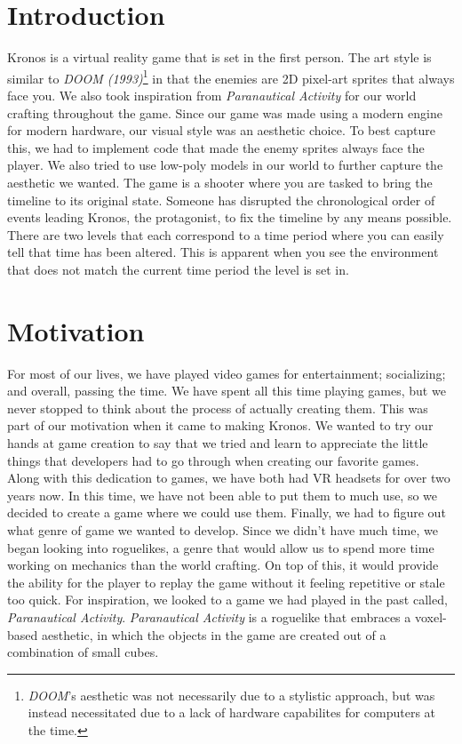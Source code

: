 \documentclass{sigchi}
\begin{document}
\section{Introduction}
Kronos is a virtual reality game that is set in the first person. The art style is similar to \textit{DOOM (1993)}\footnote[1]{\textit{DOOM}'s aesthetic was not necessarily due to a stylistic approach, but was instead necessitated due to a lack of hardware capabilites for computers at the time.} in that the enemies are 2D pixel-art sprites that always face you. We also took inspiration from \textit{Paranautical Activity} for our world crafting throughout the game. Since our game was made using a modern engine for modern hardware, our visual style was an aesthetic choice. To best capture this, we had to implement code that made the enemy sprites always face the player. We also tried to use low-poly models in our world to further capture the aesthetic we wanted. The game is a shooter where you are tasked to bring the timeline to its original state. Someone has disrupted the chronological order of events leading Kronos, the protagonist, to fix the timeline by any means possible. There are two levels that each correspond to a time period where you can easily tell that time has been altered. This is apparent when you see the environment that does not match the current time period the level is set in. 

\section{Motivation}
For most of our lives, we have played video games for entertainment; socializing; and overall, passing the time. We have spent all this time playing games, but we never stopped to think about the process of actually creating them. This was part of our motivation when it came to making Kronos. We wanted to try our hands at game creation to say that we tried and learn to appreciate the little things that developers had to go through when creating our favorite games. Along with this dedication to games, we have both had VR headsets for over two years now. In this time, we have not been able to put them to much use, so we decided to create a game where we could use them. Finally, we had to figure out what genre of game we wanted to develop. Since we didn’t have much time, we began looking into roguelikes, a genre that would allow us to spend more time working on mechanics than the world crafting. On top of this, it would provide the ability for the player to replay the game without it feeling repetitive or stale too quick. For inspiration, we looked to a game we had played in the past called, \textit{Paranautical Activity}. \textit{Paranautical Activity} is a roguelike that embraces a voxel-based aesthetic, in which the objects in the game are created out of a combination of small cubes. 
\end{document}
